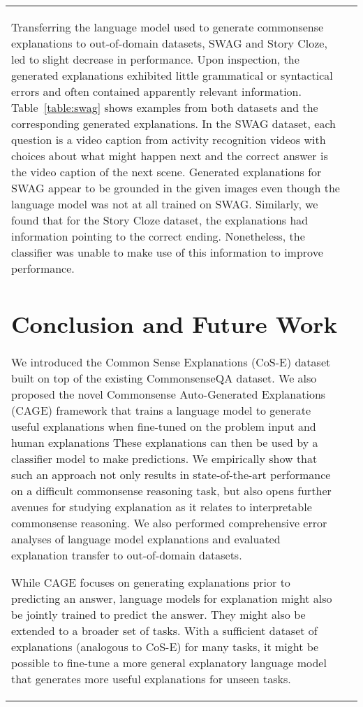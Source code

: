 \documentclass[11pt,a4paper]{article}
\begin{document}
\begin{table*}[!ht]
\begin{tabular}{ll}
Transferring the language model used to generate commonsense explanations to out-of-domain datasets, SWAG and Story Cloze, led to slight decrease in performance. Upon inspection, the generated explanations exhibited little grammatical or syntactical errors and often contained apparently relevant information. Table~\ref{table:swag} shows examples from both datasets and the corresponding generated explanations. In the SWAG dataset, each question is a video caption from activity recognition videos with choices about what might happen next and the correct answer is the video caption of the next scene. Generated explanations for SWAG appear to be grounded in the given images even though the language model was not at all trained on SWAG. Similarly, we found that for the Story Cloze dataset, the explanations had information pointing to the correct ending. Nonetheless, the classifier was unable to make use of this information to improve performance.  \section{Conclusion and Future Work}
\vspace{-0.2cm}
We introduced the Common Sense Explanations
(CoS-E) dataset built on top of the existing CommonsenseQA
dataset. We also proposed
the novel Commonsense Auto-Generated Explanations (CAGE)
framework that trains a language model to
generate useful explanations when fine-tuned on
the problem input and human explanations 
These
explanations can then be used by a classifier model
to make predictions. We empirically show that
such an approach not only results in state-of-the-art
performance on a difficult commonsense reasoning task, but also opens further avenues for studying explanation as it relates to interpretable commonsense reasoning. We also performed comprehensive error analyses of language model explanations and evaluated explanation transfer to out-of-domain datasets. 

While CAGE focuses on generating explanations prior to predicting an answer, language models for explanation might also be jointly trained to predict the answer. They might also be extended to a broader set of tasks. With a sufficient dataset of explanations (analogous to CoS-E) for many tasks, it might be possible to fine-tune a more general explanatory language model that generates more useful explanations for unseen tasks.


\end{tabular}
\end{table*}
\end{document}

